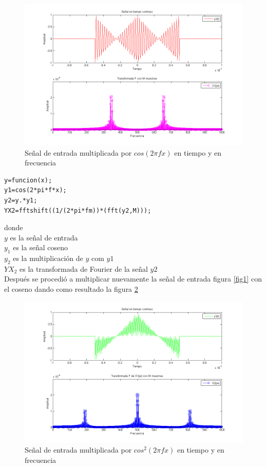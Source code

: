 \documentclass[onecolumn]{IEEEtran}
\begin{document}
\begin{figure}[h]
		\includegraphics[scale=0.55]{1.png}
	\caption{Señal de entrada multiplicada por $cos(2\pi fx)$ en tiempo y en frecuencia}
    \label{fig2}
\end{figure}
\noindent
\begin{verbatim}
y=funcion(x);
y1=cos(2*pi*f*x);
y2=y.*y1;
YX2=fftshift((1/(2*pi*fm))*(fft(y2,M)));
\end{verbatim}
\noindent
donde\\
$y$ es la señal de entrada\\
$y_1$ es la señal coseno\\
$y_2$ es la multiplicación de $y$ com $y1$\\
$YX_2$ es la transformada de Fourier de la señal $y2$\\
Después se procedió a multiplicar nuevamente la señal de entrada figura \ref{fig1} con el coseno dando como resultado la figura \ref{fig3}
\begin{figure}[h]
		\includegraphics[scale=0.55]{2.png}
	\caption{Señal de entrada multiplicada por $cos^2(2\pi fx)$ en tiempo y en frecuencia}
    \label{fig3}
\end{figure}
\end{document}
